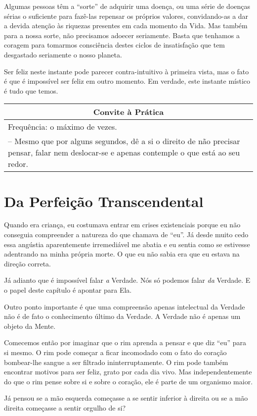 \documentclass[oneside, 12pt]{book}
\newenvironment{prat}[1]
{\begin{center}
\begin{tabular}{p{0.9\textwidth}}
\hline\hline
\multicolumn{1}{c}{Convite à Prática}\\
\hline
Frequência: #1.\\
\hline
}{\\
\hline\hline
\end{tabular} 
\end{center}}
\begin{document}
Algumas pessoas têm a ``sorte'' de adquirir uma doença, ou uma série de doenças sérias o suficiente para fazê-las repensar os próprios valores, convidando-as a dar a devida atenção às riquezas presentes em cada momento da Vida. Mas também para a nossa sorte, não precisamos adoecer seriamente. Basta que tenhamos a coragem para tomarmos consciência destes ciclos de insatisfação que tem desgastado seriamente o nosso planeta.

Ser feliz neste instante pode parecer contra-intuitivo à primeira vista, mas o fato é que é impossível ser feliz em outro momento. Em verdade, este instante místico é tudo que temos.

\begin{prat}{o máximo de vezes}
-- Mesmo que por alguns segundos, dê a si o direito de não precisar pensar, falar nem deslocar-se e apenas contemple o que está ao seu redor.
\end{prat}

\chapter*{Da Perfeição Transcendental}

Quando era criança, eu costumava entrar em crises existenciais porque eu não conseguia compreender a natureza do que chamava de ``eu''. Já desde muito cedo essa angústia aparentemente irremediável me abatia e eu sentia como se estivesse adentrando na minha própria morte. O que eu não sabia era que eu estava na direção correta.

Já adianto que é impossível falar \textit{a} Verdade. Nós só podemos falar \textit{da} Verdade. E o papel deste capítulo é apontar para Ela.

Outro ponto importante é que uma compreensão apenas intelectual da Verdade não é de fato o conhecimento último da Verdade. A Verdade não é apenas um objeto da Mente.

Comecemos então por imaginar que o rim aprenda a pensar e que diz ``eu'' para si mesmo. O rim pode começar a ficar incomodado com o fato do coração bombear-lhe sangue a ser filtrado ininterruptamente. O rim pode também encontrar motivos para ser feliz, grato por cada dia vivo. Mas independentemente do que o rim pense sobre si e sobre o coração, ele é parte de um organismo maior.

Já pensou se a mão esquerda começasse a se sentir inferior à direita ou se a mão direita começasse a sentir orgulho de si?
\end{document}
